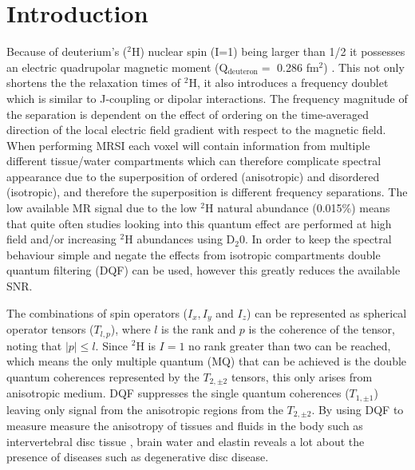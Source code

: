 \documentclass[class=article, crop=false]{standalone}
\begin{document}
 
\label{chap:Quad}

\section{Introduction}

Because of deuterium's ($^2$H) nuclear spin (I=1) being larger than 1/2 it possesses an electric quadrupolar magnetic moment (Q$_{\text{deuteron}}=$ 0.286 fm$^2$) \cite{Stone2015NuclearData}. This not only shortens the the relaxation times of $^2$H, it also introduces a frequency doublet which is similar to J-coupling or dipolar interactions. The frequency magnitude of the separation is dependent on the effect of ordering on the time-averaged direction of the local electric field gradient with respect to the magnetic field\cite{Seelig1977DeuteriumMembranes, Eliav2016MultipleMRS}. When performing MRSI each voxel will contain information from multiple different tissue/water compartments which can therefore complicate spectral appearance due to the superposition of ordered (anisotropic) and disordered (isotropic), and therefore the superposition is different frequency separations. The low available MR signal due to the low $^2$H natural abundance (0.015\%) means that quite often studies looking into this quantum effect are performed at high field \cite{Gursan2022ResidualMuscle} and\cite{Ooms2015DoubleTissue}/or\cite{Damion2022DoubleLoading} increasing $^2$H abundances using D$_2$0. In order to keep the spectral behaviour simple and negate the effects from isotropic compartments double quantum filtering (DQF) can be used\cite{Sharf1995DetectionNMR-Spectroscopy, Perea20072HDisc}, however this greatly reduces the available SNR. 

The combinations of spin operators ($I_x, I_y$ and $I_z$) can be represented as spherical operator tensors ($T_{l,p}$), where $l$ is the rank and $p$ is the coherence of the tensor, noting that $|p| \le l$. Since $^2$H is $I=1$ no rank greater than two can be reached, which means the only multiple quantum (MQ) that can be achieved is the double quantum coherences represented by the $T_{2,\pm2}$ tensors, this only arises from anisotropic medium. DQF suppresses the single quantum coherences ($T_{1,\pm1}$) leaving only signal from the anisotropic regions from the $T_{2,\pm2}$. By using DQF to measure measure the anisotropy of tissues and fluids in the body such as intervertebral disc tissue \cite{Ooms2015DoubleTissue}, brain water\cite{Assaf1997InSpectroscopy} and elastin\cite{Sun2010InvestigationNMR} reveals a lot about the presence of diseases such as degenerative disc disease\cite{Ooms2015DoubleTissue}.
\end{document}

